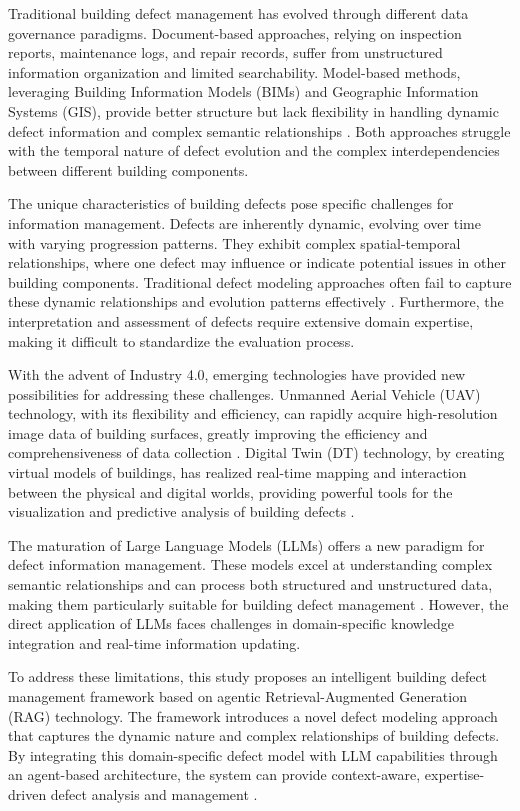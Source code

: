 \documentclass[a4paper,fleqn]{cas-sc}
\begin{document}
Traditional building defect management has evolved through different data governance paradigms. Document-based approaches, relying on inspection reports, maintenance logs, and repair records, suffer from unstructured information organization and limited searchability. Model-based methods, leveraging Building Information Models (BIMs) and Geographic Information Systems (GIS), provide better structure but lack flexibility in handling dynamic defect information and complex semantic relationships \cite{li2024single}. Both approaches struggle with the temporal nature of defect evolution and the complex interdependencies between different building components.

The unique characteristics of building defects pose specific challenges for information management. Defects are inherently dynamic, evolving over time with varying progression patterns. They exhibit complex spatial-temporal relationships, where one defect may influence or indicate potential issues in other building components. Traditional defect modeling approaches often fail to capture these dynamic relationships and evolution patterns effectively \cite{wang2023augmented}. Furthermore, the interpretation and assessment of defects require extensive domain expertise, making it difficult to standardize the evaluation process.

With the advent of Industry 4.0, emerging technologies have provided new possibilities for addressing these challenges. Unmanned Aerial Vehicle (UAV) technology, with its flexibility and efficiency, can rapidly acquire high-resolution image data of building surfaces, greatly improving the efficiency and comprehensiveness of data collection \cite{mohammadi2023integration}. Digital Twin (DT) technology, by creating virtual models of buildings, has realized real-time mapping and interaction between the physical and digital worlds, providing powerful tools for the visualization and predictive analysis of building defects \cite{chen2023improving}.

The maturation of Large Language Models (LLMs) offers a new paradigm for defect information management. These models excel at understanding complex semantic relationships and can process both structured and unstructured data, making them particularly suitable for building defect management \cite{gao2023survey}. However, the direct application of LLMs faces challenges in domain-specific knowledge integration and real-time information updating.

To address these limitations, this study proposes an intelligent building defect management framework based on agentic Retrieval-Augmented Generation (RAG) technology. The framework introduces a novel defect modeling approach that captures the dynamic nature and complex relationships of building defects. By integrating this domain-specific defect model with LLM capabilities through an agent-based architecture, the system can provide context-aware, expertise-driven defect analysis and management \cite{ding2024survey}.
\end{document}
